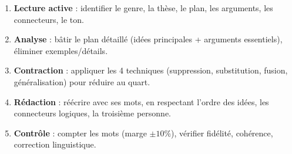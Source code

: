 \documentclass[11pt]{article}
\begin{document}
\begin{methode}
\begin{enumerate}
\item \textbf{Lecture active} : identifier le genre, la thèse, le plan, les arguments, les connecteurs, le ton.
\item \textbf{Analyse} : bâtir le plan détaillé (idées principales + arguments essentiels), éliminer exemples/détails.
\item \textbf{Contraction} : appliquer les 4 techniques (suppression, substitution, fusion, généralisation) pour réduire au quart.
\item \textbf{Rédaction} : réécrire avec ses mots, en respectant l'ordre des idées, les connecteurs logiques, la troisième personne.
\item \textbf{Contrôle} : compter les mots (marge $\pm 10\%$), vérifier fidélité, cohérence, correction linguistique.
\end{enumerate}
\end{methode}
\end{document}
